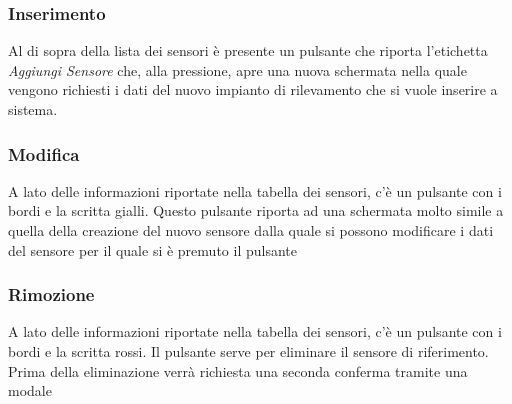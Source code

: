 \documentclass[a4paper, 12pt]{article}
\begin{document}
\subsubsection{Inserimento}
Al di sopra della lista dei sensori è presente un pulsante che riporta l'etichetta \textit{Aggiungi Sensore} che, alla pressione, apre una nuova schermata nella quale vengono richiesti i dati del nuovo impianto di rilevamento che si vuole inserire a sistema.

\subsubsection{Modifica}
A lato delle informazioni riportate nella tabella dei sensori, c'è un pulsante con i bordi e la scritta gialli. Questo pulsante riporta ad una schermata molto simile a quella della creazione del nuovo sensore dalla quale si possono modificare i dati del sensore per il quale si è premuto il pulsante

\subsubsection{Rimozione}
A lato delle informazioni riportate nella tabella dei sensori, c'è un pulsante con i bordi e la scritta rossi. Il pulsante serve per eliminare il sensore di riferimento. Prima della eliminazione verrà richiesta una seconda conferma tramite una modale
\end{document}
